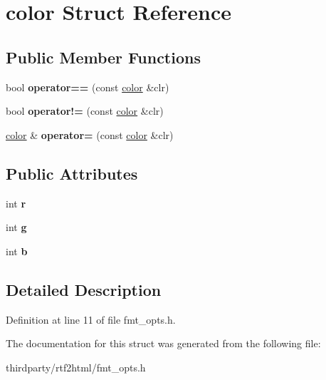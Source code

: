 \hypertarget{structcolor}{}\section{color Struct Reference}
\label{structcolor}
\subsection*{Public Member Functions}
\begin{DoxyCompactItemize}
\item 
\mbox{\label{structcolor_aa929bdb2fa239835243f825f17299965}} 
bool {\bfseries operator==} (const \hyperlink{structcolor}{color} \&clr)
\item 
\mbox{\label{structcolor_aad9b75145d66e65f447e989a85e9f5a6}} 
bool {\bfseries operator!=} (const \hyperlink{structcolor}{color} \&clr)
\item 
\mbox{\label{structcolor_ad30592b1bbc8c9b46a226a558757c52c}} 
\hyperlink{structcolor}{color} \& {\bfseries operator=} (const \hyperlink{structcolor}{color} \&clr)
\end{DoxyCompactItemize}
\subsection*{Public Attributes}
\begin{DoxyCompactItemize}
\item 
\mbox{\label{structcolor_adf42bf89ce203b7b9b3677bd6ae571d8}} 
int {\bfseries r}
\item 
\mbox{\label{structcolor_a7b23afbfdc39f8f97369aa0f9cdad48d}} 
int {\bfseries g}
\item 
\mbox{\label{structcolor_af18acfb5e593334f215f2f9c391f25e7}} 
int {\bfseries b}
\end{DoxyCompactItemize}


\subsection{Detailed Description}


Definition at line 11 of file fmt\+\_\+opts.\+h.



The documentation for this struct was generated from the following file\+:\begin{DoxyCompactItemize}
\item 
thirdparty/rtf2html/fmt\+\_\+opts.\+h\end{DoxyCompactItemize}
